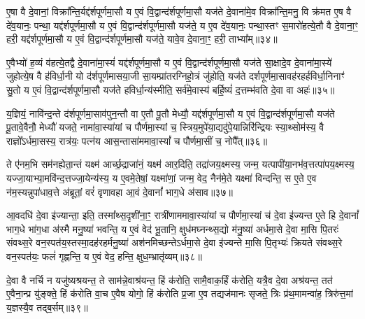 ए॒षा वै दे॒वानां॒ विक्रा᳚न्ति॒र्यद्द॑र्\mbox{}शपूर्णमा॒सौ य ए॒वं वि॒द्वान्द॑र्\mbox{}शपूर्णमा॒सौ यज॑ते दे॒वाना॑मे॒व विक्रा᳚न्ति॒मनु॒ वि क्र॑मत ए॒ष वै दे॑व॒यानः॒ पन्था॒ यद्द॑र्\mbox{}शपूर्णमा॒सौ य ए॒वं वि॒द्वान्द॑र्\mbox{}शपूर्णमा॒सौ यज॑ते॒ य ए॒व दे॑व॒यानः॒ पन्था॒स्तꣳ स॒मारो॑हत्ये॒तौ वै दे॒वाना॒ꣳ॒ हरी॒ यद्द॑र्\mbox{}शपूर्णमा॒सौ य ए॒वं वि॒द्वान्द॑र्\mbox{}शपूर्णमा॒सौ यज॑ते॒ यावे॒व दे॒वाना॒ꣳ॒ हरी॒ ताभ्या᳚म्॥३४॥

ए॒वैभ्यो॑ ह॒व्यं व॑हत्ये॒तद्वै दे॒वाना॑मा॒स्यं॑ यद्द॑र्\mbox{}शपूर्णमा॒सौ य ए॒वं वि॒द्वान्द॑र्\mbox{}शपूर्णमा॒सौ यज॑ते सा॒क्षादे॒व दे॒वाना॑मा॒स्ये॑ जुहोत्ये॒ष वै ह॑विर्धा॒नी यो द॑र्\mbox{}शपूर्णमासया॒जी सा॒यम्प्रा॑तरग्निहो॒त्रं जु॑होति॒ यज॑ते दर्\mbox{}शपूर्णमा॒सावह॑रहर्\mbox{}हविर्धा॒निनाꣳ॑ सु॒तो य ए॒वं वि॒द्वान्द॑र्\mbox{}शपूर्णमा॒सौ यज॑ते हविर्धा॒न्य॑स्मीति॒ सर्व॑मे॒वास्य॑ बर्\mbox{}हि॒ष्यं॑ द॒त्तम्भ॑वति दे॒वा वा अहः॑॥३५॥

य॒ज्ञियं॒ नावि॑न्द॒न्ते द॑र्\mbox{}शपूर्णमा॒साव॑पुन॒न्तौ वा ए॒तौ पू॒तौ मेध्यौ॒ यद्द॑र्\mbox{}शपूर्णमा॒सौ य ए॒वं वि॒द्वान्द॑र्\mbox{}शपूर्णमा॒सौ यज॑ते पू॒तावे॒वैनौ॒ मेध्यौ॑ यजते॒ नामा॑वा॒स्या॑यां च पौर्णमा॒स्यां च॒ स्त्रिय॒मुपे॑या॒द्यदु॑पे॒यान्निरि॑न्द्रियः स्या॒थ्सोम॑स्य॒ वै राज्ञो᳚\-ऽर्धमा॒सस्य॒ रात्र॑यः॒ पत्न॑य आस॒न्तासा॑ममावा॒स्यां᳚ च पौर्णमा॒सीं च॒ नोपै᳚त्॥३६॥

ते ए॑नम॒भि सम॑नह्येता॒न्तं यक्ष्म॑ आर्च्छ॒द्राजा॑नं॒ यक्ष्म॑ आर॒दिति॒ तद्रा॑जय॒क्ष्मस्य॒ जन्म॒ यत्पापी॑या॒नभ॑व॒त्त\-त्पा॑पय॒क्ष्मस्य॒ यज्जा॒याभ्या॒मवि॑न्द॒त्तज्जा॒येन्य॑स्य॒ य ए॒वमे॒तेषां॒ यक्ष्मा॑णां॒ जन्म॒ वेद॒ नैन॑मे॒ते यक्ष्मा॑ विन्दन्ति॒ स ए॒ते ए॒व न॑म॒स्यन्नुपा॑धाव॒त्ते अ॑ब्रूतां॒ वरं॑ वृणावहा आ॒वं दे॒वानां᳚ भाग॒धे अ॑साव॥३७॥

आ॒वदधि॑ दे॒वा इ॑ज्यान्ता॒ इति॒ तस्मा᳚थ्स॒दृशी॑ना॒ꣳ॒ रात्री॑णाममावा॒स्या॑यां च पौर्णमा॒स्यां च॑ दे॒वा इ॑ज्यन्त ए॒ते हि दे॒वानां᳚ भाग॒धे भा॑ग॒धा अ॑स्मै मनु॒ष्या॑ भवन्ति॒ य ए॒वं वेद॑ भू॒तानि॒ क्षुध॑मघ्नन्थ्स॒द्यो म॑नु॒ष्या॑ अर्धमा॒से दे॒वा मा॒सि पि॒तरः॑ संवथ्स॒रे वन॒स्पत॑य॒स्तस्मा॒दह॑रहर्मनु॒ष्या॑ अश॑नमिच्छन्ते\-ऽर्धमा॒से दे॒वा इ॑ज्यन्ते मा॒सि पि॒तृभ्यः॑ क्रियते संवथ्स॒रे वन॒स्पत॑यः॒ फलं॑ गृह्णन्ति॒ य ए॒वं वेद॒ हन्ति॒ क्षुध॒म्भ्रातृ॑व्यम्॥३८॥

{\anuvakamend[{प॒श्य॒ति॒ ताभ्या॒मह॑रैदसाव॒ फलꣳ॑ स॒प्त च॑॥६॥}]}

दे॒वा वै नर्चि न यजु॑ष्यश्रयन्त॒ ते साम॑न्ने॒वाश्र॑यन्त॒ हिं क॑रोति॒ सामै॒वाक॒र्\mbox{}हिं क॑रोति॒ यत्रै॒व दे॒वा अश्र॑यन्त॒ तत॑ ए॒वैना॒न्प्र यु॑ङ्क्ते॒ हिं क॑रोति वा॒च ए॒वैष योगो॒ हिं क॑रोति प्र॒जा ए॒व तद्यज॑मानः सृजते॒ त्रिः प्र॑थ॒मामन्वा॑ह॒ त्रिरु॑त्त॒मां य॒ज्ञस्यै॒व तद्ब॒र्\mbox{}सम्॥३९॥

